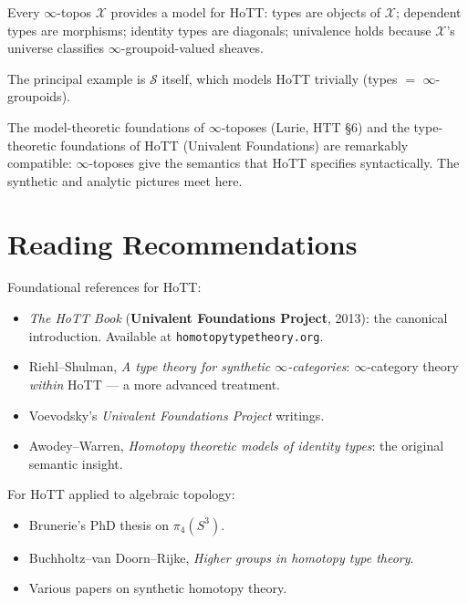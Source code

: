 \begin{theorem}
\label{thm:infty-topos-hott}
Every $\infty$-topos $\mathcal{X}$ provides a model for HoTT: types
are objects of $\mathcal{X}$; dependent types are morphisms; identity
types are diagonals; univalence holds because $\mathcal{X}$'s universe
classifies $\infty$-groupoid-valued sheaves.

The principal example is $\mathcal{S}$ itself, which models HoTT
trivially (types $=$ $\infty$-groupoids).
\end{theorem}

\begin{remark}
The model-theoretic foundations of $\infty$-toposes (Lurie, HTT §6) and
the type-theoretic foundations of HoTT (Univalent Foundations) are
remarkably compatible: $\infty$-toposes give the semantics that HoTT
specifies syntactically. The synthetic and analytic pictures meet here.
\end{remark}


\section{Reading Recommendations}
\label{sec:hott-reading}

\begin{remark}[Where to go]
Foundational references for HoTT:
\begin{itemize}
  \item \emph{The HoTT Book} (\textbf{Univalent Foundations Project}, 2013):
        the canonical introduction. Available at \texttt{homotopytypetheory.org}.
  \item Riehl–Shulman, \emph{A type theory for synthetic $\infty$-categories}:
        $\infty$-category theory \emph{within} HoTT — a more advanced
        treatment.
  \item Voevodsky's \emph{Univalent Foundations Project} writings.
  \item Awodey–Warren, \emph{Homotopy theoretic models of identity types}:
        the original semantic insight.
\end{itemize}

For HoTT applied to algebraic topology:
\begin{itemize}
  \item Brunerie's PhD thesis on $\pi_4(S^3)$.
  \item Buchholtz–van Doorn–Rijke, \emph{Higher groups in homotopy type theory}.
  \item Various papers on synthetic homotopy theory.
\end{itemize}
\end{remark}


